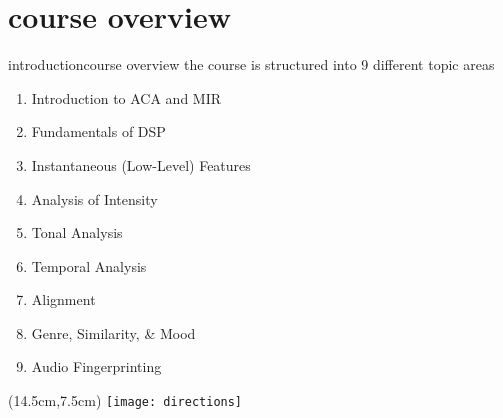     \section[course overview]{course overview}
        \begin{frame}{introduction}{course overview}
            the course is structured into 9 different topic areas
            \begin{enumerate}
                \item   Introduction to ACA and MIR
                \item   Fundamentals of DSP
                \item   Instantaneous (Low-Level) Features
                \item   Analysis of Intensity
                \item   Tonal Analysis
                \item   Temporal Analysis
                \bigskip
                \item   Alignment
                \item   Genre, Similarity, \& Mood
                \item   Audio Fingerprinting
            \end{enumerate}
            \begin{textblock*}{100mm}(14.5cm,7.5cm)
                \texttt{[image: directions]}
            \end{textblock*}
        \end{frame}
        
